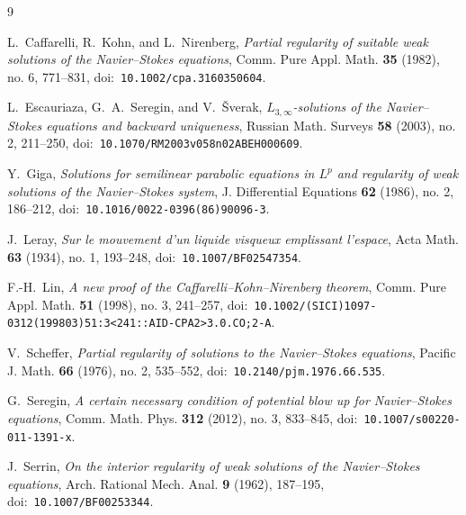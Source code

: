 \documentclass[11pt]{amsart}
\theoremstyle{plain}
\theoremstyle{definition}
\theoremstyle{remark}
\begin{document}
\begin{thebibliography}{9}

L.~Caffarelli, R.~Kohn, and L.~Nirenberg,
\emph{Partial regularity of suitable weak solutions of the Navier--Stokes
 equations},
Comm. Pure Appl. Math. \textbf{35} (1982), no. 6, 771--831,
doi:\ \nolinkurl{10.1002/cpa.3160350604}.

L.~Escauriaza, G.~A.~Seregin, and V.~{\v S}verak,
\emph{\(L_{3,\infty}\)-solutions of the Navier--Stokes equations and
 backward uniqueness},
Russian Math. Surveys \textbf{58} (2003), no. 2, 211--250,
doi:\ \nolinkurl{10.1070/RM2003v058n02ABEH000609}.

Y.~Giga,
\emph{Solutions for semilinear parabolic equations in \(L^p\) and regularity
 of weak solutions of the Navier--Stokes system},
J. Differential Equations \textbf{62} (1986), no. 2, 186--212,
doi:\ \nolinkurl{10.1016/0022-0396(86)90096-3}.

J.~Leray,
\emph{Sur le mouvement d'un liquide visqueux emplissant l'espace},
Acta Math. \textbf{63} (1934), no. 1, 193--248,
doi:\ \nolinkurl{10.1007/BF02547354}.

F.-H.~Lin,
\emph{A new proof of the Caffarelli--Kohn--Nirenberg theorem},
Comm. Pure Appl. Math. \textbf{51} (1998), no. 3, 241--257,
doi:\ \nolinkurl{10.1002/(SICI)1097-0312(199803)51:3<241::AID-CPA2>3.0.CO;2-A}.

V.~Scheffer,
\emph{Partial regularity of solutions to the Navier--Stokes equations},
Pacific J. Math. \textbf{66} (1976), no. 2, 535--552,
doi:\ \nolinkurl{10.2140/pjm.1976.66.535}.

G.~Seregin,
\emph{A certain necessary condition of potential blow up for Navier--Stokes
 equations},
Comm. Math. Phys. \textbf{312} (2012), no. 3, 833--845,
doi:\ \nolinkurl{10.1007/s00220-011-1391-x}.

J.~Serrin,
\emph{On the interior regularity of weak solutions of the Navier--Stokes
 equations},
Arch. Rational Mech. Anal. \textbf{9} (1962), 187--195,
doi:\ \nolinkurl{10.1007/BF00253344}.

\end{thebibliography}
\end{document}
